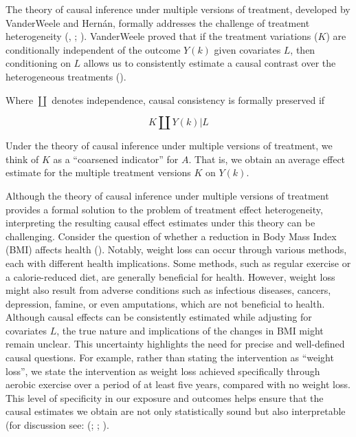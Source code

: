 \documentclass[
  singlecolumn,
  9pt]{article}
\begin{document}
The theory of causal inference under multiple versions of treatment,
developed by VanderWeele and Hernán, formally addresses the challenge of
treatment heterogeneity (, ;
).
VanderWeele proved that if the treatment variations (\(K\)) are
conditionally independent of the outcome \(Y(k)\) given covariates
\(L\), then conditioning on \(L\) allows us to consistently estimate a
causal contrast over the heterogeneous treatments
().

Where \(\coprod\) denotes independence, causal consistency is formally
preserved if

\[
K \coprod Y(k) | L
\]

Under the theory of causal inference under multiple versions of
treatment, we think of \(K\) as a ``coarsened indicator'' for \(A\).
That is, we obtain an average effect estimate for the multiple treatment
versions \(K\) on \(Y(k)\).

Although the theory of causal inference under multiple versions of
treatment provides a formal solution to the problem of treatment effect
heterogeneity, interpreting the resulting causal effect estimates under
this theory can be challenging. Consider the question of whether a
reduction in Body Mass Index (BMI) affects health
(). Notably, weight
loss can occur through various methods, each with different health
implications. Some methods, such as regular exercise or a
calorie-reduced diet, are generally beneficial for health. However,
weight loss might also result from adverse conditions such as infectious
diseases, cancers, depression, famine, or even amputations, which are
not beneficial to health. Although causal effects can be consistently
estimated while adjusting for covariates \(L\), the true nature and
implications of the changes in BMI might remain unclear. This
uncertainty highlights the need for precise and well-defined causal
questions. For example, rather than stating the intervention as ``weight
loss'', we state the intervention as weight loss achieved specifically
through aerobic exercise over a period of at least five years, compared
with no weight loss. This level of specificity in our exposure and
outcomes helps ensure that the causal estimates we obtain are not only
statistically sound but also interpretable (for discussion see:
(;
;
).
\end{document}
